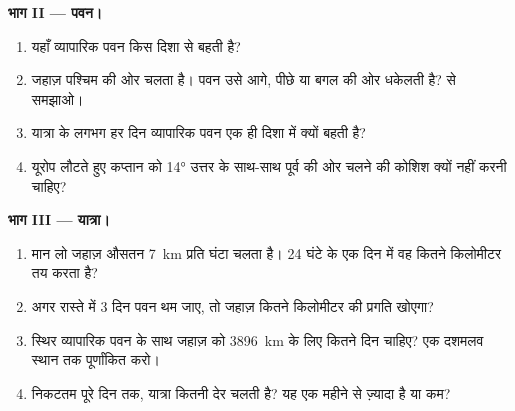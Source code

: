 \begin{problem}
\noindent\textbf{भाग II --- पवन।}\par\nopagebreak
\begin{enumerate}[resume, beginpenalty=10000]
  \item यहाँ व्यापारिक पवन किस दिशा से बहती है?
  \item जहाज़ पश्चिम की ओर चलता है। पवन उसे आगे, पीछे या बगल की ओर धकेलती है?
         से समझाओ।
  \item यात्रा के लगभग हर दिन व्यापारिक पवन एक ही दिशा में क्यों बहती
        है?
  \item यूरोप लौटते हुए कप्तान को \ang{14} उत्तर के साथ-साथ पूर्व की ओर चलने की कोशिश
        क्यों नहीं करनी चाहिए?
\end{enumerate}

\noindent\textbf{भाग III --- यात्रा।}\par\nopagebreak
\begin{enumerate}[resume, beginpenalty=10000]
  \item मान लो जहाज़ औसतन \qty{7}{km} प्रति घंटा चलता है। 24 घंटे के एक दिन में वह
        कितने किलोमीटर तय करता है?
  \item अगर रास्ते में 3 दिन पवन थम जाए, तो जहाज़ कितने किलोमीटर की प्रगति
        खोएगा?
  \item स्थिर व्यापारिक पवन के साथ जहाज़ को \qty{3896}{km} के लिए कितने दिन चाहिए?
        एक दशमलव स्थान तक पूर्णांकित करो।
  \item निकटतम पूरे दिन तक, यात्रा कितनी देर चलती है? यह एक महीने से ज़्यादा है
        या कम?
\end{enumerate}
\end{problem}
